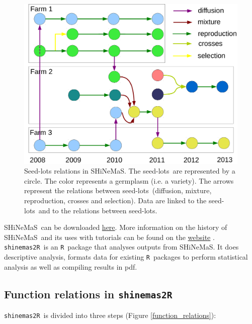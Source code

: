 \documentclass{article}\usepackage[]{graphicx}\usepackage[]{color}
\newcommand{\R}{\texttt{R}}
\renewcommand{\sl}{seed-lots}
\newcommand{\BD}{SHiNeMaS}
\newcommand{\pack}{\texttt{shinemas2R}}
\begin{document}
\begin{figure}[H]
\begin{center}
\includegraphics[width=.8\textwidth]{relation_SL_EN}
\caption{
Seed-lots relations in \BD. 
The \sl~are represented by a circle.
The color represents a germplasm (i.e. a variety).
The arrows represent the relations between \sl~(diffusion, mixture, reproduction, crosses and selection).
Data are linked to the \sl~and to the relations between \sl.
}
\label{relation_SL}
\end{center}
\end{figure}

\BD~can be downloaded \href{http://moulon.inra.fr/index.php/en/tranverse-team/atelier-de-bioinformatique/projects/181}{here}.
More information on the history of \BD~and its uses with tutorials can be found on the \href{http://moulon.inra.fr/index.php/en/tranverse-team/atelier-de-bioinformatique/projects/181}{website} \citep{deoliveira_shinemas_2015}.\\

\pack~is an \R~package that analyses outputs from \BD.
It does descriptive analysis, formats data for existing \R~packages to perform statistical analysis as well as compiling results in pdf.


\subsection{Function relations in \pack}

\pack~is divided into three steps (Figure \ref{function_relations}):
\end{document}
